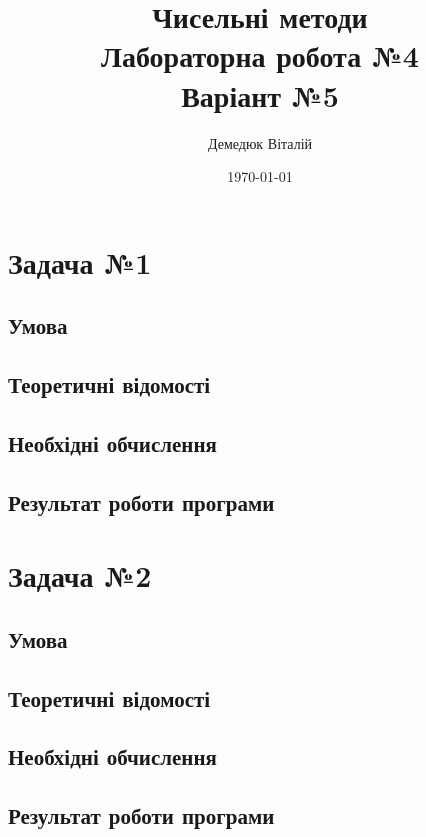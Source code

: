\documentclass[a4paper, 12pt]{article}
\author{Демедюк Віталій}
\title{Чисельні методи\\
	   Лабораторна робота №4\\
	   Варіант №5}
\date{\today}
\begin{document}
\maketitle

\newpage
\tableofcontents

\newpage
\section{Задача №1}

\subsection{Умова}

\subsection{Теоретичні відомості}

\subsection{Необхідні обчислення}

\subsection{Результат роботи програми}

\newpage
\section{Задача №2}

\subsection{Умова}

\subsection{Теоретичні відомості}

\subsection{Необхідні обчислення}

\subsection{Результат роботи програми}
\end{document}
